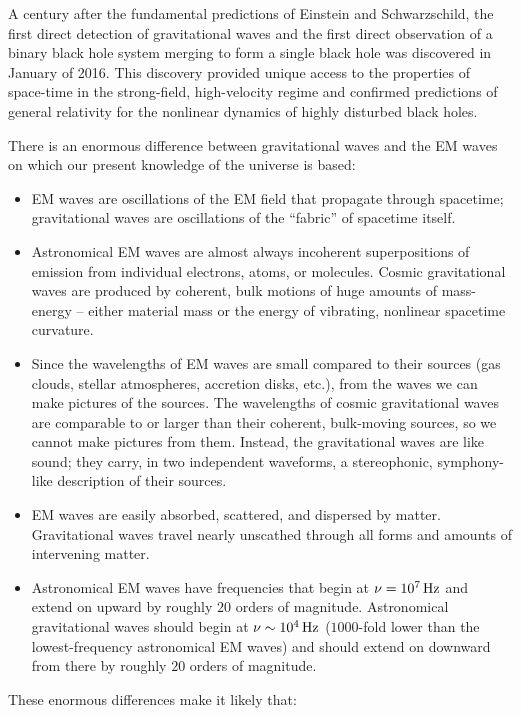 \documentclass[a4paper,10pt]{article}
\begin{document}
{\noindent}A century after the fundamental predictions of Einstein and Schwarzschild, the first direct detection of gravitational waves and the first direct observation of a binary black hole system merging to form a single black hole was discovered in January of 2016. This discovery provided unique access to the properties of space-time in the strong-field, high-velocity regime and confirmed predictions of general relativity for the nonlinear dynamics of highly disturbed black holes.

{\noindent}There is an enormous difference between gravitational waves and the EM waves on which our present knowledge of the universe is based:

\begin{itemize}
    \item EM waves are oscillations of the EM field that propagate through spacetime; gravitational waves are oscillations of the ``fabric'' of spacetime itself.
    \item Astronomical EM waves are almost always incoherent superpositions of emission from individual electrons, atoms, or molecules. Cosmic gravitational waves are produced by coherent, bulk motions of huge amounts of mass-energy -- either material mass or the energy of vibrating, nonlinear spacetime curvature.
    \item Since the wavelengths of EM waves are small compared to their sources (gas clouds, stellar atmospheres, accretion disks, etc.), from the waves we can make pictures of the sources. The wavelengths of cosmic gravitational waves are comparable to or larger than their coherent, bulk-moving sources, so we cannot make pictures from them. Instead, the gravitational waves are like sound; they carry, in two independent waveforms, a stereophonic, symphony-like description of their sources.
    \item EM waves are easily absorbed, scattered, and dispersed by matter. Gravitational waves travel nearly unscathed through all forms and amounts of intervening matter.
    \item Astronomical EM waves have frequencies that begin at $\nu=10^7\,{\rm Hz}$ and extend on upward by roughly $20$ orders of magnitude. Astronomical gravitational waves should begin at $\nu\sim10^4\,{\rm Hz}$ ($1000$-fold lower than the lowest-frequency astronomical EM waves) and should extend on downward from there by roughly $20$ orders of magnitude.
\end{itemize}

{\noindent}These enormous differences make it likely that:
\end{document}

